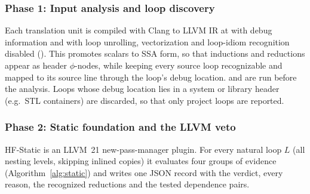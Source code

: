 \subsubsection{Phase 1: Input analysis and loop discovery}
Each translation unit is compiled with Clang to LLVM IR at  with debug information and with loop unrolling, vectorization and loop-idiom recognition disabled (). This promotes scalars to SSA form, so that inductions and reductions appear as header $\phi$-nodes, while keeping every source loop recognizable and mapped to its source line through the loop's debug location.  and  are run before the analysis. Loops whose debug location lies in a system or library header (e.g.\ STL containers) are discarded, so that only project loops are reported.

\subsubsection{Phase 2: Static foundation and the LLVM veto}
\label{sec:static}
HF-Static is an LLVM~21 new-pass-manager plugin. For every natural loop $L$ (all nesting levels, skipping inlined copies) it evaluates four groups of evidence (Algorithm~\ref{alg:static}) and writes one JSON record with the verdict, every reason, the recognized reductions and the tested dependence pairs.


